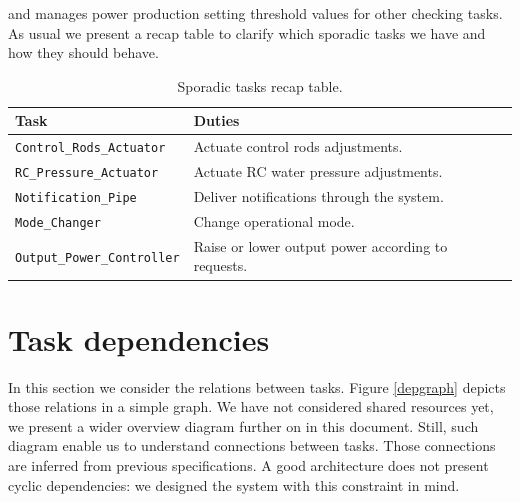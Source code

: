 \documentclass[10pt,a4paper]{report}
\begin{document}
and manages power production setting threshold values for other checking tasks. 
As usual we present a recap table to clarify which sporadic tasks we have and 
how they should behave.
\begin{table}[b]
\centering 
\begin{tabular}{|l p{7cm}|}
\hline 
\textbf{Task} & \textbf{Duties} \\
\hline \hline
\texttt{Control\_Rods\_Actuator} & Actuate control rods adjustments.\\
\texttt{RC\_Pressure\_Actuator} & Actuate RC water pressure adjustments.\\
\texttt{Notification\_Pipe} & Deliver notifications through the system.\\
\texttt{Mode\_Changer} & Change operational mode.\\
\texttt{Output\_Power\_Controller} & Raise or lower output power according to 
    requests.\\
\hline
\end{tabular}
\caption{Sporadic tasks recap table.}
\end{table}

\section{Task dependencies}
In this section we consider the relations between tasks. 
Figure \ref{depgraph} depicts those relations in a simple graph. We have not
considered shared resources yet, we present a wider overview diagram further on
in this document. Still, such diagram enable us to understand connections between
tasks. Those connections are inferred from previous specifications. A good 
architecture does not present cyclic dependencies: we designed the system with 
this constraint in mind.
\end{document}
